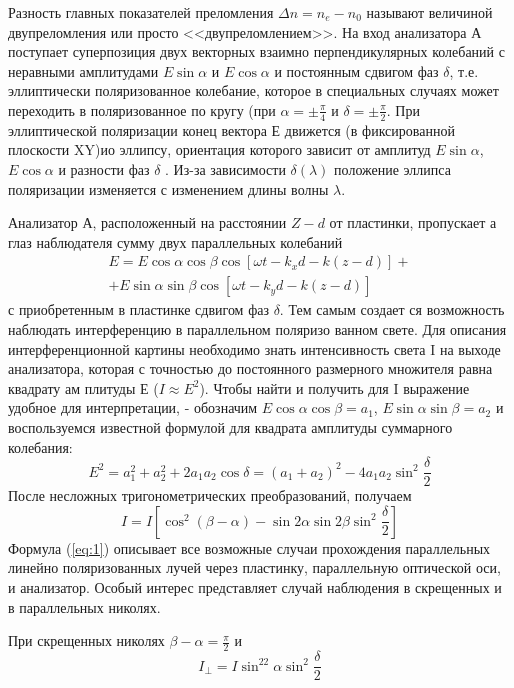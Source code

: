 Разность главных показателей преломления $\Delta n=n_e-n_0$
называют величиной двупреломления или просто <<двупреломлением>>.
На вход анализатора А поступает суперпозиция двух векторных
взаимно перпендикулярных колебаний с неравными амплитудами
$E\sin\alpha$ и $E\cos\alpha$ и постоянным сдвигом фаз $\delta$, т.е. эллиптически поляризованное колебание, которое
в специальных случаях может переходить в поляризованное по кру­гу 
(при $\alpha=\pm\frac{\pi}{4}$ и $\delta=\pm\frac{\pi}{2}$. При эллиптической
поляризации конец вектора Е движется (в фиксированной плоскости
XY)ио эллипсу, ориентация которого зависит от амплитуд
$E\sin\alpha$, $E\cos\alpha$ и разности фаз $\delta$ . Из-за
зависимости $\delta(\lambda)$ положение эллипса поляризации изменяется
с изменением длины волны $\lambda$.

Анализатор А, расположенный на расстоянии $Z-d$ от
пластинки, пропускает а глаз наблюдателя сумму двух параллельных
колебаний 
\begin{gather}
	E=E\cos\alpha\cos\beta\cos\left[\omega t -k_xd-k(z-d) \right]+\\
	+E\sin\alpha\sin\beta\cos\left[\omega t -k_yd-k(z-d) \right]
\end{gather}
с приобретенным в пластинке сдвигом фаз $\delta$. Тем самым создает­
ся возможность наблюдать интерференцию в параллельном поляризо­
ванном свете. Для описания интерференционной картины необходимо
знать интенсивность света I на выходе анализатора, которая с
точностью до постоянного размерного множителя равна квадрату ам­
плитуды Е ($I\approx E^2$). Чтобы найти и получить для I выражение
удобное для интерпретации, - обозначим $E\cos\alpha\cos\beta=a_1$,
$E\sin\alpha\sin\beta=a_2$  и воспользуемся известной формулой
для квадрата амплитуды суммарного колебания:
\begin{equation}
	E^2=a_1^2+a_2^2+2a_1a_2\cos\delta=(a_1+a_2)^2-4a_1a_2\sin^2\frac{\delta}{2}
\end{equation}
После несложных тригонометрических преобразований, получаем
\begin{equation}
	\label{eq:1}
	I=I\left[\cos^2(\beta-\alpha)-\sin2\alpha\sin2\beta\sin^2\frac{\delta}{2} \right]
\end{equation}
Формула (\ref{eq:1}) описывает все возможные случаи прохождения параллельных линейно поляризованных лучей через пластинку, параллельную
оптической оси, и анализатор. Особый интерес представляет слу­чай наблюдения в скрещенных и в параллельных николях.

При скрещенных николях $\beta-\alpha=\frac{\pi}{2}$ и
\begin{equation}
	\label{eq:3bot}
	I_{\bot}=I\sin^22\alpha \sin^2\frac{\delta}{2}
\end{equation}

